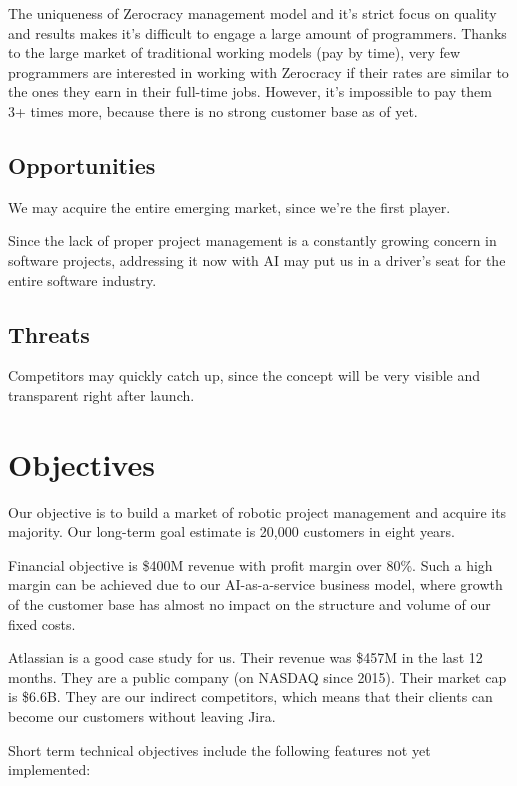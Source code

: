 \documentclass{main}
\begin{document}
The uniqueness of Zerocracy management model and it's strict focus on quality
and results makes it's difficult to engage a large amount of programmers. Thanks
to the large market of traditional working models (pay by time), very few
programmers are interested in working with Zerocracy if their rates are
similar to the ones they earn in their full-time jobs. However, it's impossible
to pay them 3+ times more, because there is no strong customer base as of yet.

\subsection{Opportunities}

We may acquire the entire emerging market, since we're the first player.

Since the lack of proper project management is a constantly growing concern in
software projects, addressing it now with AI may put us in a driver's seat for
the entire software industry.

\subsection{Threats}

Competitors may quickly catch up, since the concept will be very visible and
transparent right after launch.

\section{Objectives}

Our objective is to build a market of robotic project management and acquire its
majority. Our long-term goal estimate is 20,000 customers in eight years.

Financial objective is \$400M revenue with profit margin over 80\%. Such a high
margin can be achieved due to our AI-as-a-service business model, where growth
of the customer base has almost no impact on the structure and volume of our
fixed costs.

Atlassian is a good case study for us. Their revenue was \$457M in the last 12
months. They are a public company (on NASDAQ since 2015). Their market cap is
\$6.6B. They are our indirect competitors, which means that their clients can
become our customers without leaving Jira.

Short term technical objectives include the following features not yet implemented:
\end{document}
